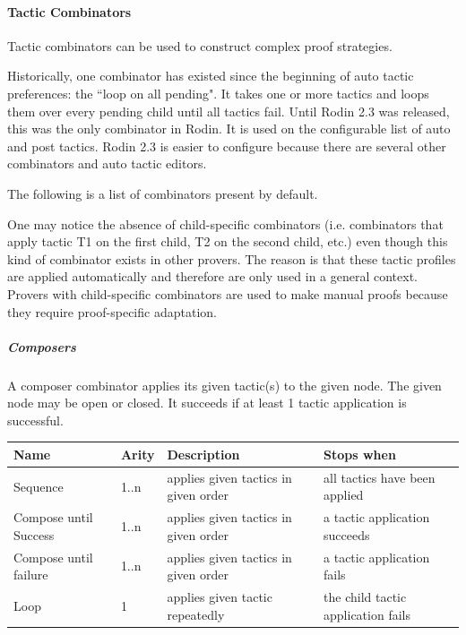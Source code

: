 \paragraph{Tactic Combinators}

Tactic combinators can be used to construct complex proof strategies.

Historically, one combinator has existed since the beginning of auto tactic preferences: the ``loop on all pending". It takes one or more tactics and loops them over every pending child until all tactics fail. Until Rodin 2.3 was released, this was the only combinator in Rodin. It is used on the configurable list of auto and post tactics. Rodin 2.3 is easier to configure because there are several other combinators and auto tactic editors.

The following is a list of combinators present by default.

One may notice the absence of child-specific combinators (i.e. combinators that apply tactic T1 on the first child, T2 on the second child, etc.) even though this kind of combinator exists in other provers. The reason is that these tactic profiles are applied automatically and therefore are only used in a general context. Provers with child-specific combinators are used to make manual proofs because they require proof-specific adaptation.

\subparagraph{Composers}

A composer combinator applies its given tactic(s) to the given node. The given node may be open or closed. It succeeds if at least 1 tactic application is successful. 

\begin{center}
    \begin{tabular}{ | p{} | l | p{} | p{} |}
    \hline
	Name & Arity & Description & Stops when  \\ \hline
	Sequence & 1..n  & applies given tactics in given order & all tactics have been applied  \\ \hline
	Compose until Success & 1..n  & applies given tactics in given order & a tactic application succeeds \\ \hline
	Compose until failure  & 1..n  & applies given tactics in given order & a tactic application fails \\ \hline
	Loop & 1 & applies given tactic repeatedly & the child tactic application fails \\ \hline
    \end{tabular}
\end{center}

